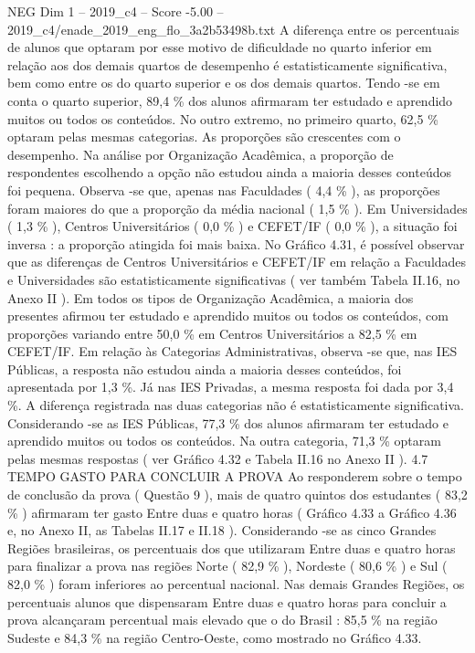 \begin{textsample}{NEG Dim 1 – 2019\_c4 – Score -5.00 – 2019\_c4/enade\_2019\_eng\_flo\_3a2b53498b.txt}
A diferença entre os percentuais de alunos que optaram por esse motivo de dificuldade no quarto inferior em relação aos dos demais quartos de desempenho é estatisticamente significativa, bem como entre os do quarto superior e os dos demais quartos.
Tendo -se em conta o quarto superior, 89,4 \% dos alunos afirmaram ter estudado e aprendido muitos ou todos os conteúdos.
No outro extremo, no primeiro quarto, 62,5 \% optaram pelas mesmas categorias.
As proporções são crescentes com o desempenho.
Na análise por Organização Acadêmica, a proporção de respondentes escolhendo a opção não estudou ainda a maioria desses conteúdos foi pequena.
Observa -se que, apenas nas Faculdades ( 4,4 \% ), as proporções foram maiores do que a proporção da média nacional ( 1,5 \% ).
Em Universidades ( 1,3 \% ), Centros Universitários ( 0,0 \% ) e CEFET/IF ( 0,0 \% ), a situação foi inversa : a proporção atingida foi mais baixa.
No Gráfico 4.31, é possível observar que as diferenças de Centros Universitários e CEFET/IF em relação a Faculdades e Universidades são estatisticamente significativas ( ver também Tabela II.16, no Anexo II ).
Em todos os tipos de Organização Acadêmica, a maioria dos presentes afirmou ter estudado e aprendido muitos ou todos os conteúdos, com proporções variando entre 50,0 \% em Centros Universitários a 82,5 \% em CEFET/IF.
Em relação às Categorias Administrativas, observa -se que, nas IES Públicas, a resposta não estudou ainda a maioria desses conteúdos, foi apresentada por 1,3 \%.
Já nas IES Privadas, a mesma resposta foi dada por 3,4 \%.
A diferença registrada nas duas categorias não é estatisticamente significativa.
Considerando -se as IES Públicas, 77,3 \% dos alunos afirmaram ter estudado e aprendido muitos ou todos os conteúdos.
Na outra categoria, 71,3 \% optaram pelas mesmas respostas ( ver Gráfico 4.32 e Tabela II.16 no Anexo II ). 4.7 TEMPO GASTO PARA CONCLUIR A PROVA Ao responderem sobre o tempo de conclusão da prova ( Questão 9 ), mais de quatro quintos dos estudantes ( 83,2 \% ) afirmaram ter gasto Entre duas e quatro horas ( Gráfico 4.33 a Gráfico 4.36 e, no Anexo II, as Tabelas II.17 e II.18 ).
Considerando -se as cinco Grandes Regiões brasileiras, os percentuais dos que utilizaram Entre duas e quatro horas para finalizar a prova nas regiões Norte ( 82,9 \% ), Nordeste ( 80,6 \% ) e Sul ( 82,0 \% ) foram inferiores ao percentual nacional.
Nas demais Grandes Regiões, os percentuais alunos que dispensaram Entre duas e quatro horas para concluir a prova alcançaram percentual mais elevado que o do Brasil : 85,5 \% na região Sudeste e 84,3 \% na região Centro-Oeste, como mostrado no Gráfico 4.33.

\end{textsample}

